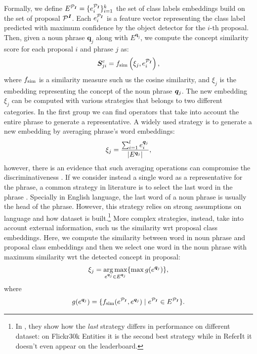 Formally, we define $E^{\mathcal{P}_{\bm{I}}} = \{e^{\mathcal{P}_{\bm{I}}}_i \}^{k}_{i=1}$ the set of class
labels embeddings build on the set of proposal $\mathcal{P}^{\bm{I}}$. Each
$e^{\mathcal{P}_{\bm{I}}}_i$ is a feature vector representing the class label predicted
with maximum confidence by the object detector for the $i$-th
proposal. Then, given a noun phrase $\bm{q}_j$ along with
$E^{\bm{q}_j}$, we compute the concept similarity score for each
proposal $i$ and phrase $j$ as:
\begin{equation}
  \bm{S}^c_{ji} = f_{\text{sim}} \left( \xi_j, e^{\mathcal{P}_{\bm{I}}}_i \right),
\end{equation}
where $f_{\text{sim}}$ is a similarity measure such us the cosine similarity,
and $\xi_j$ is the embedding representing the concept of the noun
phrase $\bm{q}_j$. The new embedding $\xi_j$ can be computed with various
strategies that belongs to two different categories. In the first
group we can find operators that take into account the entire phrase
to generate a representative. A widely used strategy is to generate a
new embedding by averaging phrase's word embeddings:
\begin{equation}
  \xi_j = \frac{\sum^l_{i=1} e^{\bm{q}_j}_i}{| E^{\bm{q}_j} |},
\end{equation}
however, there is an evidence that such averaging operations can
compromise the discriminativeness
\cite{wang2019phrase,datta2019align2ground}. If we consider instead a
single word as a representative for the phrase, a common strategy in
literature is to select the last word in the phrase
\cite{wang2019phrase}. Specially in English language, the last word of
a noun phrase is usually the head of the phrase. However, this
strategy relies on strong assumptions on language and how dataset is
built.\footnote{In \cite{wang2019phrase}, they show how the
\textit{last} strategy differs in performance on different dataset: on
Flickr30k Entities it is the second best strategy while in ReferIt it
doesn't even appear on the leaderboard.} More complex strategies,
instead, take into account external information, such us the
similarity wrt proposal class embeddings. Here, we compute the
similarity between word in noun phrase and proposal class embeddings
and then we select one word in the noun phrase with maximum similarity
wrt the detected concept in proposal:
\begin{equation}
  \xi_j = \operatorname*{arg\,max}_{e^{\bm{q}_j} \in E^{\bm{q}_j}} \{ \max g(e^{\bm{q}_j}) \},
\end{equation}
where
\begin{equation}
  g(e^{\bm{q}_j}) = \{ f_{\text{sim}}(e^{\mathcal{P}_{\bm{I}}}, e^{\bm{q}_j}) \mid e^{\mathcal{P}_{\bm{I}}} \in E^{\mathcal{P}_{\bm{I}}} \}.
\end{equation}

